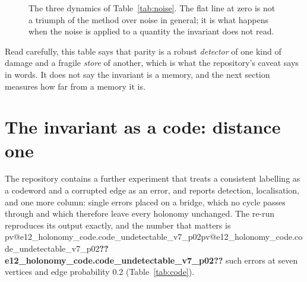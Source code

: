 \documentclass[11pt,a4paper]{article}
\makeatletter
\newcommand{\val}[1]{\ifcsname pv@#1\endcsname\csname pv@#1\endcsname\else\textbf{??#1??}\fi}
\makeatother
\begin{document}
\begin{figure}[t]
\centering
{}
\caption{The three dynamics of Table~\ref{tab:noise}. The flat line at zero is not a triumph of
the method over noise in general; it is what happens when the noise is applied to a quantity the
invariant does not read.}
\label{fig:noise}
\end{figure}

Read carefully, this table says that parity is a robust \emph{detector} of one kind of damage and
a fragile \emph{store} of another, which is what the repository's caveat says in words. It does
not say the invariant is a memory, and the next section measures how far from a memory it is.

\section{The invariant as a code: distance one}
\label{sec:code}

The repository contains a further experiment that treats a consistent labelling as a codeword and
a corrupted edge as an error, and reports detection, localisation, and one more column: single
errors placed on a bridge, which no cycle passes through and which therefore leave every holonomy
unchanged. The re-run reproduces its output exactly, and the number that matters is
\val{e12_holonomy_code.code_undetectable_v7_p02} such errors at seven vertices and edge
probability 0.2 (Table~\ref{tab:code}).
\end{document}
